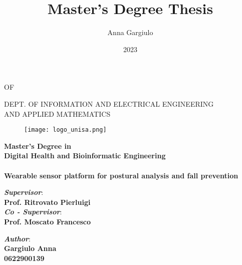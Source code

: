 \documentclass[a4paper, 12pt, oneside, hidelinks]{book}
\title{Master's Degree Thesis}
\author{Anna Gargiulo}
\date{2023}
\begin{document}
\begin{titlepage}

    \begin{center}
        {\Large\textsc{\scalebox{1.2}{University}}} 
        {\Large\textsc{{OF}}} 
        {\Large\textsc{\scalebox{1.2}{Salerno}}}     
        \noindent\vspace{4mm}
        
    	\uppercase{\normalsize Dept. of Information and Electrical Engineering \\and Applied Mathematics }\\
    \end{center}
    
    \begin{figure}[H]
        \centering
        \texttt{[image: logo\_unisa.png]}
    \end{figure}
    
    \begin{center}
    	\normalsize{\textbf{Master's Degree in \\Digital Health and Bioinformatic Engineering \\}}
        \small{\textbf{\\}}
    	\vspace{15mm}
        {\Large{\bf Wearable sensor platform for postural analysis and fall prevention}}\\
    	\vspace{3mm}
    \end{center}
    
    \vspace{15mm}
    \noindent
    \begin{minipage}[t]{0.47\textwidth}
    	{\large{ \textit{\textbf{Supervisor}}:\\\bf Prof. Ritrovato Pierluigi}}
    	\vspace{2mm}\\
     {\large{ \textit{\textbf{Co - Supervisor}}:\\\bf Prof. Moscato Francesco}}
    \end{minipage}
    \hfill
    \begin{minipage}[t]{0.4\textwidth}\raggedleft
    	{\large{\textit{\textbf{Author}}: \\ \bf Gargiulo Anna\\ 0622900139}}
    \end{minipage}
    
    \vspace{20mm}
    

\end{titlepage}

\end{document}
